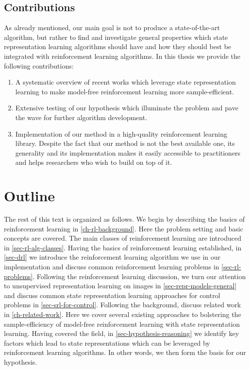 \subsection{Contributions}
\label{subsec-contributions}
As already mentioned, our main goal is not to produce a state-of-the-art algorithm,
but rather to find and investigate general properties which state representation learning algorithms 
should have and how they should best be integrated with reinforcement learning algorithms.
In this thesis we provide the following contributions:
\begin{enumerate}
	\item A systematic overview of recent works which leverage state representation learning
		to make model-free reinforcement learning more sample-efficient.
	\item Extensive testing of our hypothesis which illuminate the problem and pave the wave 
			for further algorithm development.
	\item Implementation of our method in a high-quality reinforcement learning library.
			Despite the fact that our method is not the best available one, its generality
			and its implementation makes it easily accessible to practitioners and 
			helps researchers who wish to build on top of it.
\end{enumerate}

\section{Outline}
The rest of this text is organized as follows.
We begin by describing the basics of reinforcement learning in \ref{ch-rl-background}.
Here the problem setting and basic concepts are covered.
The main classes of 
reinforcement learning are introduced in \ref{sec-rl-alg-classes}.
Having the basics of reinforcement learning established, 
in \ref{sec-drl} we introduce the reinforcement learning algorithm 
we use in our implementation
and discuss common reinforcement learning problems in \ref{sec-rl-problems}.
Following the reinforcement learning discussion, we
turn our attention to unsupervised representation learning on images in \ref{sec-repr-models-general}
and discuss common state representation learning approaches for control problems in \ref{sec-srl-for-control}.
Following the background,
discuss related work in \ref{ch-related-work}.
Here we cover several existing approaches to bolstering the sample-efficiency of model-free reinforcement learning with
state representation learning. 
Having covered the field, in \ref{sec-hypothesis-reasoning} we identify key factors which lead to state representations which 
can be leveraged by reinforcement learning algorithms.
In other words, we then form the basis for our hypothesis.



